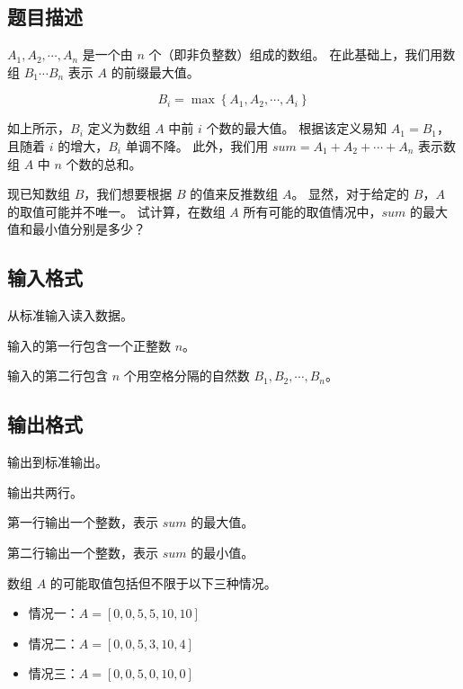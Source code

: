 \subsection*{题目描述}

$A_1, A_2, \cdots, A_n$ 是一个由 $n$ 个{}（即非负整数）组成的数组。
在此基础上，我们用数组 $B_1 \cdots B_n$ 表示 $A$ 的前缀最大值。

\begin{equation*}
    B_i = \max \left\{ A_1, A_2,  \cdots, A_i \right\}
\end{equation*}

如上所示，$B_i$ 定义为数组 $A$ 中前 $i$ 个数的最大值。
根据该定义易知 $A_1 = B_1$，且随着 $i$ 的增大，$B_i$ 单调不降。
此外，我们用 $sum = A_1 + A_2 + \cdots + A_n$ 表示数组 $A$ 中 $n$ 个数的总和。

现已知数组 $B$，我们想要根据 $B$ 的值来反推数组 $A$。
显然，对于给定的 $B$，$A$ 的取值可能并不唯一。
试计算，在数组 $A$ 所有可能的取值情况中，$sum$ 的最大值和最小值分别是多少？

\subsection*{输入格式}

从标准输入读入数据。

输入的第一行包含一个正整数 $n$。

输入的第二行包含 $n$ 个用空格分隔的自然数 $B_1, B_2, \cdots, B_n$。

\subsection*{输出格式}

输出到标准输出。

输出共两行。

第一行输出一个整数，表示 $sum$ 的最大值。

第二行输出一个整数，表示 $sum$ 的最小值。

\examplebox*{}{}

数组 $A$ 的可能取值包括但不限于以下三种情况。

\begin{itemize}
    \item 情况一：$A = [0, 0, 5, 5, 10, 10]$
    \item 情况二：$A = [0, 0, 5, 3, 10, 4]$
    \item 情况三：$A = [0, 0, 5, 0, 10, 0]$
\end{itemize}

